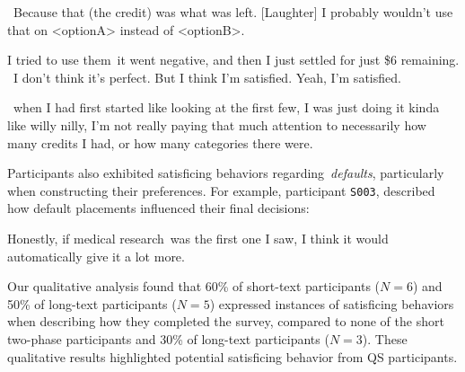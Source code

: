 \begin{displayquote}
    ~\bracketellipsis Because that (the credit) was what was left. [Laughter] I probably wouldn't use that on <optionA> instead of <optionB>.~\bracketellipsis \hfill{}

    I tried to use them~\bracketellipsis it went negative, and then I just settled for just \$6 remaining. ~\bracketellipsis I don't think it's perfect. But I think I'm satisfied. Yeah, I'm satisfied.  \hfill{}

    ~\bracketellipsis when I had first started like looking at the first few, I was just doing it kinda like willy nilly, I'm not really paying that much attention to necessarily how many credits I had, or how many categories there were. \hfill{}
\end{displayquote}

Participants also exhibited satisficing behaviors regarding~\textit{defaults}, particularly when constructing their preferences. For example, participant \texttt{S003}, described how default placements influenced their final decisions:

\begin{displayquote}
    Honestly, if medical research~\bracketellipsis was the first one I saw, I think it would automatically give it a lot more. \hfill{}
\end{displayquote}

Our qualitative analysis found that 60\% of short-text participants ($N=6$) and 50\% of long-text participants ($N=5$) expressed instances of satisficing behaviors when describing how they completed the survey, compared to none of the short two-phase participants and 30\% of long-text participants ($N=3$). These qualitative results highlighted potential satisficing behavior from QS participants.















